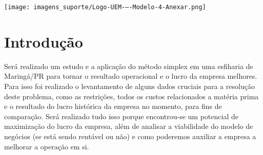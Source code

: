 \documentclass[
	12pt,				%
	openright,			%
	oneside,			%
	a4paper,			%
	english,			%
	french,				%
	spanish,			%
	brazil				%
	]{abntex2}
\begin{document}
\begin{minipage}[c][1cm][c]{1cm} %

\centering

\texttt{[image: imagens\_suporte/Logo-UEM-–-Modelo-4-Anexar.png]}  

\end{minipage}


\frenchspacing 


\imprimircapa


\setlength{\absparsep}{18pt} %



\tableofcontents*
\cleardoublepage



\textual

\chapter*[Introdução]{Introdução}

	Será realizado um estudo e a aplicação do método simplex em uma esfiharia de Maringá/PR para tornar o resultado operacional e o lucro da empresa melhores. Para isso foi realizado o levantamento de alguns dados cruciais para a resolução deste problema, como as restrições, todos os custos relacionados a matéria prima e o resultado do lucro histórica da empresa no momento, para fins de comparação. Será realizado tudo isso porque encontrou-se um potencial de maximização do lucro da empresa, além de analisar a viabilidade do modelo de negócios (se está sendo rentável ou não) e como poderemos auxiliar a empresa a melhorar a operação em si. \cite{ehrlich1991} \cite{milhomem2015utilizaccao}
\end{document}
